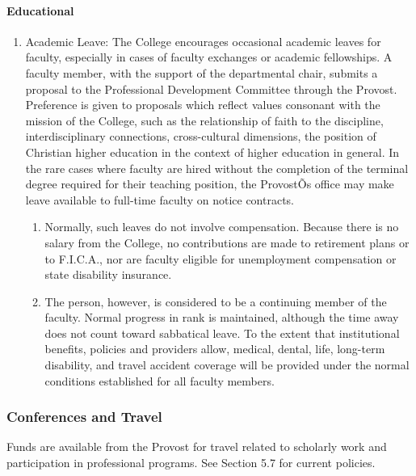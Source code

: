 \documentclass[letterpaper, 11pt]{article}
\begin{document}
			\paragraph{Educational}
				\begin{enumerate}[label=\alph*)]
					\item{Academic Leave:  The College encourages occasional academic leaves for faculty, especially in cases of faculty exchanges or academic fellowships.  A faculty member, with the support of the departmental chair, submits a proposal to the Professional Development Committee through the Provost.  Preference is given to proposals which reflect values consonant with the mission of the College, such as the relationship of faith to the discipline, interdisciplinary connections, cross-cultural dimensions, the position of Christian higher education in the context of higher education in general.  In the rare cases where faculty are hired without the completion of the terminal degree required for their teaching position, the ProvostÕs office may make leave available to full-time faculty on notice contracts.
						\begin{enumerate}[label=\arabic*)]
							\item{Normally, such leaves do not involve compensation.  Because there is no salary from the College, no contributions are made to retirement plans or to F.I.C.A., nor are faculty eligible for unemployment compensation or state disability insurance.}
							\item{The person, however, is considered to be a continuing member of the faculty. Normal progress in rank is maintained, although the time away does not count toward sabbatical leave.  To the extent that institutional benefits, policies and providers allow, medical, dental, life, long-term disability, and travel accident coverage will be provided under the normal conditions established for all faculty members.}
						\end{enumerate}
					}
				\end{enumerate}
		\subsubsection{Conferences and Travel}
			Funds are available from the Provost for travel related to scholarly work and participation in professional programs.  See Section 5.7 for current policies.
\end{document}
